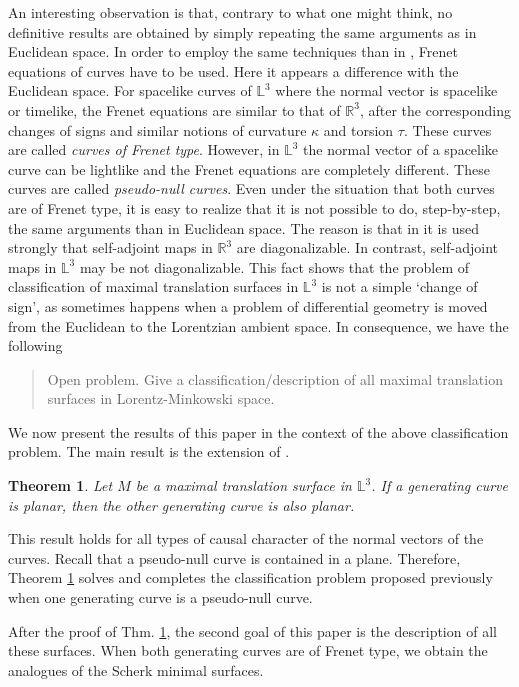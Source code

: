 \documentclass[a4paper,12pt]{amsart}
\numberwithin{equation}{section}
\newtheorem{theorem}{Theorem}[section]
\theoremstyle{definition}
\def\r{\mathbb R}
\def\r{\mathbb R}
\def\rr{\mathbb L}
\begin{document}
An interesting observation is that, contrary to what one might think, no definitive results are obtained by simply repeating the same arguments as in Euclidean space. In order to employ the same techniques than in \cite{hl,lp}, Frenet equations of curves have to be used. Here it appears a  difference with the Euclidean space. For spacelike curves of $\rr^3$ where the normal vector is spacelike or timelike, the Frenet equations are similar to that of $\r^3$, after the corresponding changes of signs and similar notions of curvature $\kappa$ and torsion $\tau$. These curves are called {\it curves of Frenet type}. However, in $\rr^3$ the normal vector of a spacelike curve can be lightlike and the Frenet equations are completely different.  These curves are called {\it pseudo-null curves}.  Even under the situation that both curves are of Frenet type, it is easy to realize that  it is not possible to do, step-by-step, the same arguments than in Euclidean space.  The reason is that in \cite{hl,lp} it is used strongly that self-adjoint maps in $\r^3$ are diagonalizable.  In contrast, self-adjoint maps in $\rr^3$ may be not diagonalizable.  This fact shows that the problem of classification of maximal translation  surfaces in $\rr^3$ is not a simple `change of sign', as sometimes happens when a problem of differential geometry is moved from the Euclidean to the Lorentzian ambient space. In consequence, we have the following
\begin{quote}{\sc Open problem.} Give a classification/description of all maximal translation surfaces in Lorentz-Minkowski space.
\end{quote}

We now present the results of this paper in the context of the above classification problem.  
The main result is the extension of  \cite{di}. 

\begin{theorem} \label{t1}
Let $M$ be a maximal translation  surface in $\rr^3$. If a generating curve is planar, then the other generating curve is also planar.  
\end{theorem}

This result holds for all types of causal character of the  normal vectors of the curves. Recall that a pseudo-null curve is contained in a plane. Therefore, Theorem \ref{t1} solves and completes the classification problem proposed previously when one generating curve is a   pseudo-null curve. 

After the proof of Thm. \ref{t1}, the second goal of this paper is the description of  all these surfaces. When both generating curves are of Frenet type, we obtain   the analogues of the Scherk minimal surfaces. 
\end{document}
